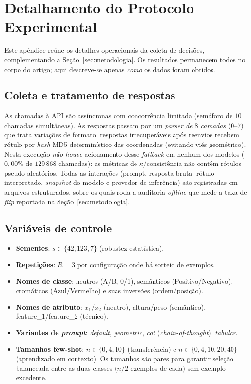 \documentclass[12pt,a4paper]{article}
\begin{document}
\section{Detalhamento do Protocolo Experimental}
\label{ap:protocolo}

Este apêndice reúne os detalhes operacionais da coleta de decisões, complementando a
Seção~\ref{sec:metodologia}. Os resultados permanecem todos no corpo do artigo; aqui
descreve-se apenas \emph{como} os dados foram obtidos.

\subsection{Coleta e tratamento de respostas}

As chamadas à API são assíncronas com concorrência limitada (semáforo de $10$ chamadas
simultâneas). As respostas passam por um \emph{parser
de $8$ camadas} ($0$–$7$) que trata variações de formato; respostas irrecuperáveis após
reenvios recebem rótulo por \emph{hash} MD5 determinístico das coordenadas (evitando viés
geométrico). Nesta execução \emph{não houve} acionamento desse \emph{fallback} em nenhum dos
modelos ($0{,}00\%$ de $129\,868$ chamadas): as métricas de $\kappa$/consistência não contêm
rótulos pseudo-aleatórios. Todas as interações (prompt, resposta bruta, rótulo
interpretado, \emph{snapshot} do modelo e provedor de inferência) são registradas em
arquivos estruturados, sobre os quais roda a auditoria \emph{offline} que mede a taxa de
\emph{flip} reportada na Seção~\ref{sec:metodologia}.

\subsection{Variáveis de controle}

\begin{itemize}
  \item \textbf{Sementes}: $s \in \{42, 123, 7\}$ (robustez estatística).
  \item \textbf{Repetições}: $R = 3$ por configuração onde há sorteio de exemplos.
  \item \textbf{Nomes de classe}: neutros (A/B, 0/1), semânticos (Positivo/Negativo),
    cromáticos (Azul/Vermelho) e suas inversões (ordem/posição).
  \item \textbf{Nomes de atributo}: $x_1/x_2$ (neutro), altura/peso (semântico),
    feature\_1/feature\_2 (técnico).
  \item \textbf{Variantes de \emph{prompt}}: \emph{default}, \emph{geometric}, \emph{cot}
    (\emph{chain-of-thought}), \emph{tabular}.
  \item \textbf{Tamanhos few-shot}: $n \in \{0,4,10\}$ (transferência) e
    $n \in \{0,4,10,20,40\}$ (aprendizado em contexto). Os tamanhos são pares para
    garantir seleção
    balanceada entre as duas classes ($n/2$ exemplos de cada) sem exemplo excedente.
\end{itemize}
\end{document}
